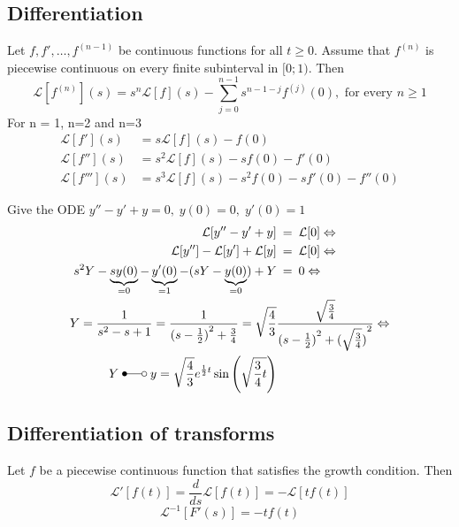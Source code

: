 \subsection{Differentiation}
Let $f, f', \dots, f^{(n-1)}$ be continuous functions for all $t \geq 0$. Assume that $f^{(n)}$ is piecewise continuous on every finite subinterval in $[0;1)$. Then %
\begin{equation*}
    \mathcal{L}[f^{(n)}](s)=s^n\mathcal{L}[f](s)-\sum_{j=0}^{n-1}s^{n-1-j}f^{(j)}(0),\text{ for every }n\geq1
\end{equation*}
For n = 1, n=2 and n=3
\begin{align*}
    \mathcal{L}[f'](s)   & =s\mathcal{L}[f](s)-f(0)                    \\
    \mathcal{L}[f''](s)  & =s^2\mathcal{L}[f](s)-sf(0)-f'(0)           \\
    \mathcal{L}[f'''](s) & =s^3\mathcal{L}[f](s)-s^2f(0)-sf'(0)-f''(0) %
\end{align*}
\begin{examplesection}[Example]
    Give the ODE $y''-y'+y=0,\;y(0)=0,\;y'(0)=1$
    \begin{align*}
        \mathcal{L}[y''-y'+y]                                                               & \:=\:\mathcal{L}[0] \Leftrightarrow                                                     \\
        \mathcal{L}[y'']-\mathcal{L}[y']+\mathcal{L}[y]                                     & \:=\:\mathcal{L}[0] \Leftrightarrow                                                     \\
        s^2Y -\underbrace{sy(0)}_{=0}-\underbrace{y'(0)}_{=1}-(sY-\underbrace{y(0)}_{=0})+Y & \:=\:0 \Leftrightarrow                                                                  \\
        Y=\frac{1}{s^2-s+1}=\frac{1}{{(s-\frac{1}{2})}^2+\frac{3}{4}}=\sqrt{\frac{4}{3}}    & \frac{\sqrt{\frac{3}{4}}}{{(s-\frac{1}{2})}^2+{(\sqrt{\frac{3}{4}})}^2} \Leftrightarrow \\
        Y\;\Laplace\;y=\sqrt{\frac{4}{3}}e^{\frac{1}{2}t}\sin\left(\sqrt{\frac{3}{4}t}\right)
    \end{align*}
\end{examplesection}

\subsection{Differentiation of transforms}
Let $f$ be a piecewise continuous function that satisfies the growth condition. Then
\begin{equation*}
    \mathcal{L}'[f(t)] = \frac{d}{ds}\mathcal{L}[f(t)] = -\mathcal{L}[t f(t)]
\end{equation*}
\begin{equation*}
    \mathcal{L}^{-1}[F'(s)] = -tf(t)
\end{equation*}

